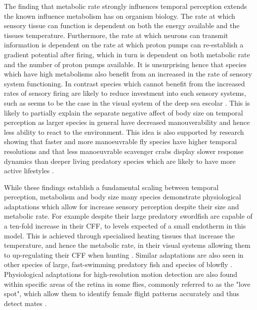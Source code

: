 The finding that metabolic rate strongly influences temporal perception extends the known influence metabolism has on organism biology. The rate at which sensory tissue can function is dependent on both the energy available and the tissues temperature. Furthermore, the rate at which neurons can transmit information is dependent on the rate at which proton pumps can re-establish a gradient potential after firing, which in turn is dependent on both metabolic rate \citep{laughlin2001energy} and the number of proton pumps available. It is unsurprising hence that species which have high metabolisms also benefit from an increased in the rate of sensory system functioning. In contrast species which cannot benefit from the increased rates of sensory firing are likely to reduce investment into such sensory systems, such as seems to be the case in the visual system of the deep sea escolar \citep{landgren2014visual}. This is likely to partially explain the separate negative affect of body size on temporal perception as larger species in general have decreased manouverability \citep{heglund1988speed,dudley2002mechanisms,biewener2003animal,sato2007stroke,vogel2008modes,hedrick2011damping,watanabe2012slowest} and hence less ability to react to the environment. This idea is also supported by research showing that faster and more manoeuvrable fly species have higher temporal resolutions \citep{laughlin1993fast} and that less manoeuvrable scavenger crabs display slower response dynamics than deeper living predatory species which are likely to have more active lifestyles \citep{frank2012light}. 


While these findings establish a fundamental scaling between temporal perception, metabolism and body size many species demonstrate physiological adaptations which allow for increase sensory perception despite their size and metabolic rate. For example despite their large predatory swordfish \citep{fritsches2005warm} are capable of a ten-fold increase in their CFF, to levels expected of a small endotherm in this model. This is achieved through specialised heating tissues that increase the temperature, and hence the metabolic rate, in their visual systems allowing them to up-regulating their CFF when hunting \citep{fritsches2005warm}. Similar adaptations are also seen in other species of large, fast-swimming predatory fish \citep{carey1982brain,block1985warm} and species of blowfly \citep{tatler2000temperature}. Physiological adaptations for high-resolution motion detection are also found within specific areas of the retina in some flies, commonly referred to as the "love spot", which allow them to identify female flight patterns accurately and thus detect mates \citep{land1974chasing}. 

